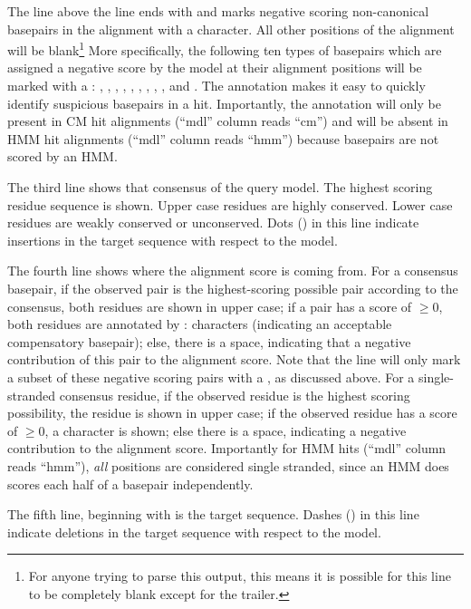 The line above the  line ends with  and marks
negative scoring non-canonical basepairs in the alignment with a
 character. All other positions of the alignment will be
blank\footnote{For anyone trying to parse this output, this means it
is possible for this line to be completely blank except for the
 trailer.} More specifically, the following ten types of
basepairs which are assigned a negative score by the model at their
alignment positions will be marked with a : ,
, , , , ,
, , , and . The 
annotation makes it easy to quickly identify suspicious basepairs in
a hit. Importantly, the  annotation will only be present in
CM hit alignments (``mdl'' column reads ``cm'') and will be absent in
HMM hit alignments (``mdl'' column reads ``hmm'') because basepairs
are not scored by an HMM.

The third line shows that consensus of the query model. The highest
scoring residue sequence is shown. Upper case residues are highly
conserved. Lower case residues are weakly conserved or unconserved.
Dots () in this line indicate insertions in the target
sequence with respect to the model.

The fourth line shows where the alignment score is coming from. For a
consensus basepair, if the observed pair is the highest-scoring
possible pair according to the consensus, both residues are shown in
upper case; if a pair has a score of $\geq 0$, both residues are
annotated by : characters (indicating an acceptable compensatory
basepair); else, there is a space, indicating that a negative
contribution of this pair to the alignment score. Note that the 
 line will only mark a subset of these negative scoring
pairs with a , as discussed above.
For a single-stranded consensus residue, if the observed residue is
the highest scoring possibility, the residue is shown in upper case;
if the observed residue has a score of $\geq 0$, a \otext{+} character
is shown; else there is a space, indicating a negative contribution to
the alignment score. Importantly for HMM hits (``mdl'' column reads
``hmm''), \emph{all} positions are considered single stranded, since
an HMM does scores each half of a basepair independently.

The fifth line, beginning with  is
the target sequence. Dashes (\otext{-}) in this line indicate deletions
in the target sequence with respect to the model.

